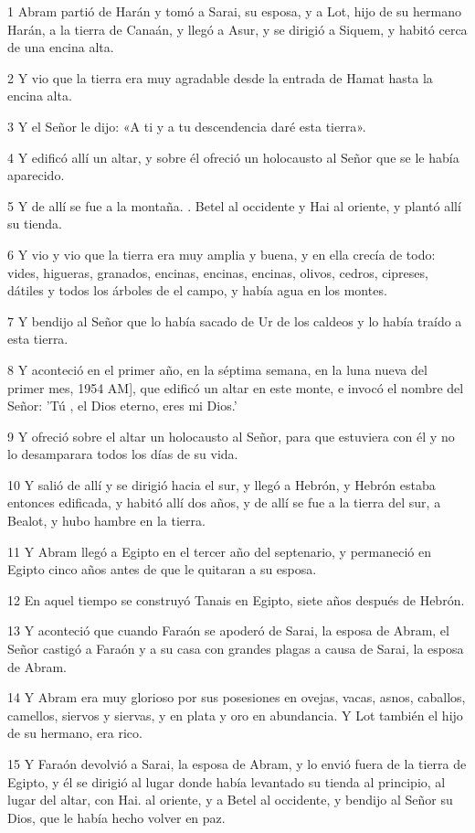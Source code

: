 \par 1 Abram partió de Harán y tomó a Sarai, su esposa, y a Lot, hijo de su hermano Harán, a la tierra de Canaán, y llegó a Asur, y se dirigió a Siquem, y habitó cerca de una encina alta.
\par 2 Y vio que la tierra era muy agradable desde la entrada de Hamat hasta la encina alta.
\par 3 Y el Señor le dijo: «A ti y a tu descendencia daré esta tierra».
\par 4 Y edificó allí un altar, y sobre él ofreció un holocausto al Señor que se le había aparecido.
\par 5 Y de allí se fue a la montaña. . Betel al occidente y Hai al oriente, y plantó allí su tienda.
\par 6 Y vio y vio que la tierra era muy amplia y buena, y en ella crecía de todo: vides, higueras, granados, encinas, encinas, encinas, olivos, cedros, cipreses, dátiles y todos los árboles de el campo, y había agua en los montes.
\par 7 Y bendijo al Señor que lo había sacado de Ur de los caldeos y lo había traído a esta tierra.
\par 8 Y aconteció en el primer año, en la séptima semana, en la luna nueva del primer mes, 1954 AM], que edificó un altar en este monte, e invocó el nombre del Señor: 'Tú , el Dios eterno, eres mi Dios.'
\par 9 Y ofreció sobre el altar un holocausto al Señor, para que estuviera con él y no lo desamparara todos los días de su vida.
\par 10 Y salió de allí y se dirigió hacia el sur, y llegó a Hebrón, y Hebrón estaba entonces edificada, y habitó allí dos años, y de allí se fue a la tierra del sur, a Bealot, y hubo hambre en la tierra.
\par 11 Y Abram llegó a Egipto en el tercer año del septenario, y permaneció en Egipto cinco años antes de que le quitaran a su esposa.
\par 12 En aquel tiempo se construyó Tanais en Egipto, siete años después de Hebrón.
\par 13 Y aconteció que cuando Faraón se apoderó de Sarai, la esposa de Abram, el Señor castigó a Faraón y a su casa con grandes plagas a causa de Sarai, la esposa de Abram.
\par 14 Y Abram era muy glorioso por sus posesiones en ovejas, vacas, asnos, caballos, camellos, siervos y siervas, y en plata y oro en abundancia. Y Lot también el hijo de su hermano, era rico.
\par 15 Y Faraón devolvió a Sarai, la esposa de Abram, y lo envió fuera de la tierra de Egipto, y él se dirigió al lugar donde había levantado su tienda al principio, al lugar del altar, con Hai. al oriente, y a Betel al occidente, y bendijo al Señor su Dios, que le había hecho volver en paz.
